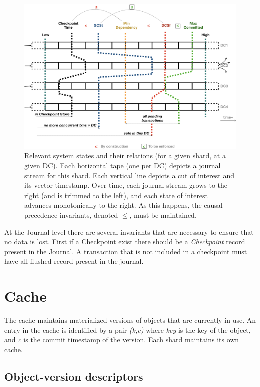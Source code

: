 \documentclass[twoside]{article}
\begin{document}
\begin{figure}[tp]
  \centering
  \includegraphics[width=\textwidth]{figures/cvts.png}
  \caption{%
    Relevant system states and their relations (for a given
    shard, at a given DC).
    Each horizontal tape (one per DC) depicts a journal stream for
    this shard.
    Each vertical line depicts a cut of interest and its
    vector timestamp.
    Over time, each journal stream grows to the right (and is
    trimmed to the left), and each state of interest advances
    monotonically to the right.
    As this happens, the causal precedence invariants, denoted
    $\le$, must be maintained.
  }
  \label{fig:system-vts}
\end{figure}

At the Journal level there are several invariants that are necessary to ensure that no
data is lost.
First if a Checkpoint exist there should be a \textit{Checkpoint} record present in the
Journal.
A transaction that is not included in a checkpoint must have all flushed record present in
the journal.


\section{Cache}
\label{sec:cache}

The cache maintains materialized versions of objects that are currently in use. 
An entry in the cache is identified by a pair \emph{(k,c)} where
\emph{key} is the key of the object, and \emph{c} is the commit timestamp of the
version. 
Each shard maintains its own cache.

\subsection{Object-version descriptors}
\label{sec:objects}
\end{document}
